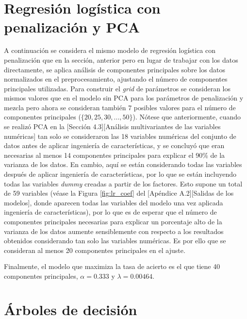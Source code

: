 \documentclass[12pt,a4paper,]{book}
\newcounter{dummy}
\numberwithin{dummy}{section}
\theoremstyle{ocrenumbox}
\theoremstyle{blacknumex}
\theoremstyle{blacknumbox}
\theoremstyle{ocrenum}
\theoremstyle{ocrenum}
\begin{document}
\hypertarget{regresiuxf3n-loguxedstica-con-penalizaciuxf3n-y-pca}{%
\section{Regresión logística con penalización y
PCA}\label{regresiuxf3n-loguxedstica-con-penalizaciuxf3n-y-pca}}

A continuación se considera el mismo modelo de regresión logística con
penalización que en la sección, anterior pero en lugar de trabajar con
los datos directamente, se aplica análisis de componentes principales
sobre los datos normalizados en el preprocesamiento, ajustando el número
de componentes principales utilizadas. Para construir el \emph{grid} de
parámetros se consideran los mismos valores que en el modelo sin PCA
para los parámetros de penalización y mezcla pero ahora se consideran
también 7 posibles valores para el número de componentes principales
(\(\{20,25,30,...,50\}\)). Nótese que anteriormente, cuando se realizó
PCA en la {[}Sección 4.3{]}{[}Análisis multivariantes de las variables
numéricas{]} tan solo se consideraron las 18 variables numéricas del
conjunto de datos antes de aplicar ingeniería de características, y se
concluyó que eran necesarias al menos 14 componentes principales para
explicar el 90\% de la varianza de los datos. En cambio, aquí se están
considerando todas las variables después de aplicar ingeniería de
características, por lo que se están incluyendo todas las variables
\emph{dummy} creadas a partir de los factores. Esto supone un total de
59 variables (véase la Figura \ref{fig:lr_coef} del {[}Apéndice
A.2{]}{[}Salidas de los modelos{]}, donde aparecen todas las variables
del modelo una vez aplicada ingeniería de características), por lo que
es de esperar que el número de componentes principales necesarias para
explicar un porcentaje alto de la varianza de los datos aumente
sensiblemente con respecto a los resultados obtenidos considerando tan
solo las variables numéricas. Es por ello que se consideran al menos 20
componentes principales en el ajuste.

Finalmente, el modelo que maximiza la tasa de acierto es el que tiene 40
componentes principales, \(\alpha= 0.333\) y \(\lambda = 0.00464\).

\hypertarget{uxe1rboles-de-decisiuxf3n}{%
\section{Árboles de decisión}\label{uxe1rboles-de-decisiuxf3n}}
\end{document}
